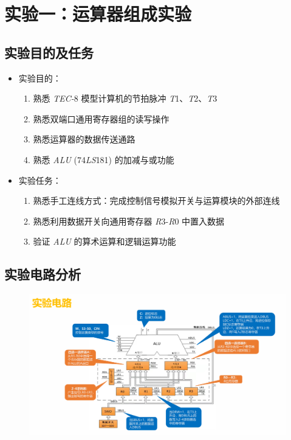 \section{实验一：运算器组成实验}
    \subsection{实验目的及任务}
        \begin{itemize}
            \item 实验目的：
            \begin{enumerate}
                \item 熟悉 \textit{TEC-}8 模型计算机的节拍脉冲 \textit{T}1、\textit{T}2、\textit{T}3
                \item 熟悉双端口通用寄存器组的读写操作
                \item 熟悉运算器的数据传送通路
                \item 熟悉 \textit{ALU} (74\textit{LS}181) 的加减与或功能 
            \end{enumerate}
            \item 实验任务：
            \begin{enumerate}
                \item 熟悉手工连线方式：完成控制信号模拟开关与运算模块的外部连线
                \item 熟悉利用数据开关向通用寄存器 \textit{R}3-\textit{R}0 中置入数据
                \item 验证 \textit{ALU} 的算术运算和逻辑运算功能
            \end{enumerate}
        \end{itemize}

    \subsection{实验电路分析}
        \begin{figure}[htbp]
            \centering
            \includegraphics[width=15 cm]{1_cu.jpg}
        \end{figure}
        
